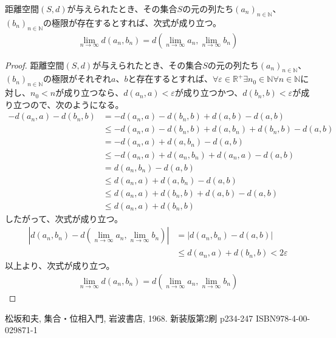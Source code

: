 \documentclass[dvipdfmx]{jsarticle}
\begin{document}
\begin{thm}\label{8.2.1.24}
距離空間$(S,d)$が与えられたとき、その集合$S$の元の列たち$\left( a_{n} \right)_{n \in \mathbb{N}}$、$\left( b_{n} \right)_{n \in \mathbb{N}}$の極限が存在するとすれば、次式が成り立つ。
\begin{align*}
\lim_{n \rightarrow \infty}{d\left( a_{n},b_{n} \right)} = d\left( \lim_{n \rightarrow \infty}a_{n},\lim_{n \rightarrow \infty}b_{n} \right)
\end{align*}
\end{thm}
\begin{proof}
距離空間$(S,d)$が与えられたとき、その集合$S$の元の列たち$\left( a_{n} \right)_{n \in \mathbb{N}}$、$\left( b_{n} \right)_{n \in \mathbb{N}}$の極限がそれぞれ$a$、$b$と存在するとすれば、$\forall\varepsilon \in \mathbb{R}^{+}\exists n_{0} \in \mathbb{N}\forall n \in \mathbb{N}$に対し、$n_{0} < n$が成り立つなら、$d\left( a_{n},a \right) < \varepsilon$が成り立つかつ、$d\left( b_{n},b \right) < \varepsilon$が成り立つので、次のようになる。
\begin{align*}
- d\left( a_{n},a \right) - d\left( b_{n},b \right) &= - d\left( a_{n},a \right) - d\left( b_{n},b \right) + d(a,b) - d(a,b)\\
&\leq - d\left( a_{n},a \right) - d\left( b_{n},b \right) + d\left( a,b_{n} \right) + d\left( b_{n},b \right) - d(a,b)\\
&= - d\left( a_{n},a \right) + d\left( a,b_{n} \right) - d(a,b)\\
&\leq - d\left( a_{n},a \right) + d\left( a_{n},b_{n} \right) + d\left( a_{n},a \right) - d(a,b)\\
&= d\left( a_{n},b_{n} \right) - d(a,b)\\
&\leq d\left( a_{n},a \right) + d\left( a,b_{n} \right) - d(a,b)\\
&\leq d\left( a_{n},a \right) + d\left( b_{n},b \right) + d(a,b) - d(a,b)\\
&\leq d\left( a_{n},a \right) + d\left( b_{n},b \right)
\end{align*}
したがって、次式が成り立つ。
\begin{align*}
\left| d\left( a_{n},b_{n} \right) - d\left( \lim_{n \rightarrow \infty}a_{n},\lim_{n \rightarrow \infty}b_{n} \right) \right| &= \left| d\left( a_{n},b_{n} \right) - d(a,b) \right|\\
&\leq d\left( a_{n},a \right) + d\left( b_{n},b \right) < 2\varepsilon
\end{align*}
以上より、次式が成り立つ。
\begin{align*}
\lim_{n \rightarrow \infty}{d\left( a_{n},b_{n} \right)} = d\left( \lim_{n \rightarrow \infty}a_{n},\lim_{n \rightarrow \infty}b_{n} \right)
\end{align*}
\end{proof}
\begin{thebibliography}{50}
  松坂和夫, 集合・位相入門, 岩波書店, 1968. 新装版第2刷 p234-247 ISBN978-4-00-029871-1
\end{thebibliography}
\end{document}
